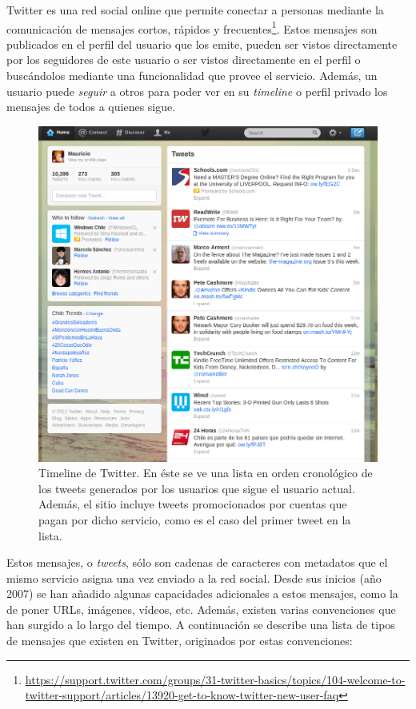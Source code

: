 \documentclass[upright, contnum]{umemoria}
\begin{document}
   Twitter es una red social online que permite conectar a
   personas mediante la comunicación de mensajes cortos, rápidos y   frecuentes\footnote{\href{https://support.twitter.com/groups/31-twitter-basics/topics/104-welcome-to-twitter-support/articles/13920-get-to-know-twitter-new-user-faq}{https://support.twitter.com/groups/31-twitter-basics/topics/104-welcome-to-twitter-support/articles/13920-get-to-know-twitter-new-user-faq} }. Estos
   mensajes son publicados en el perfil del usuario que los emite,
   pueden ser vistos directamente por los seguidores de este usuario o
   ser vistos directamente en el perfil o buscándolos mediante una
   funcionalidad que provee el servicio. Además, un usuario puede
   \emph{seguir} a otros para poder ver en su \emph{timeline} o perfil privado 
   los mensajes de todos a quienes sigue.
   
\begin{figure}[h!b]
  \centering
  \includegraphics[width=12cm]{./img/twitter.png}
  \caption[Timeline de Twitter.]
   {Timeline de Twitter. En éste se ve una lista en orden cronológico
  de los tweets generados por los usuarios que sigue el usuario
  actual. Además, el sitio incluye tweets promocionados por cuentas
  que pagan por dicho servicio, como es el caso del primer tweet en la
  lista.}
\end{figure}
   
   Estos mensajes, o \emph{tweets}, sólo son cadenas de caracteres con
   metadatos que el mismo servicio asigna una vez enviado a la red
   social. Desde sus inicios (año 2007) se han añadido algunas capacidades
   adicionales a estos mensajes, como la de poner URLs, imágenes,
   vídeos, etc. Además, existen varias convenciones que han surgido a
   lo largo del tiempo. A continuación se describe una lista de tipos
   de mensajes que existen en Twitter, originados por estas convenciones:
\end{document}
